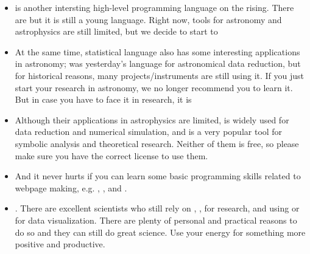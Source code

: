 \documentclass[letterpaper,10pt,english]{sphinxmanual}
\begin{document}
\begin{itemize}
\item {} 
 is another intersting high-level
programming language on the rising. There are 
but it is still a young language. Right now,  tools for
astronomy and astrophysics are still limited, but we decide to start
to 

\item {} 
At the same time, 
statistical language also has some interesting applications in
astronomy;
was yesterday’s language for astronomical data reduction, but for
historical reasons, many projects/instruments are still using it. If
you just start your research in astronomy, we no longer recommend you
to learn it. But in case you have to face it in research, it is 

\item {} 
Although their applications in astrophysics are limited,
 is widely
used for data reduction and numerical simulation, and
 is a very
popular tool for symbolic analysis and theoretical research. Neither
of them is free, so please make sure you have the correct license to
use them.

\item {} 
And it never hurts if you can learn some basic programming skills
related to webpage making, e.g.
,
, and
.

\item {} 
.
There are excellent scientists who still rely on ,
,  for
research, and using
 or
 for data visualization. There
are plenty of personal and practical reasons to do so and they can
still do great science. Use your energy for something more positive
and productive.

\end{itemize}
\end{document}
